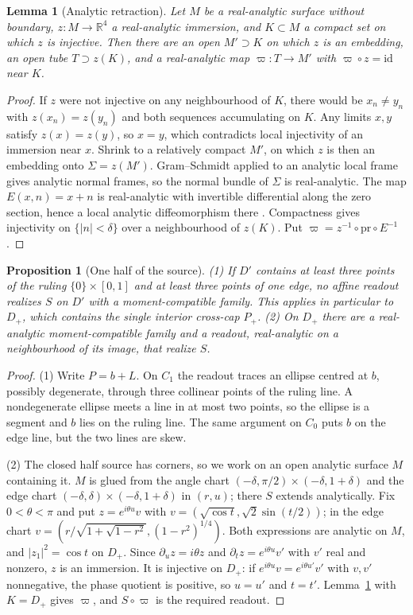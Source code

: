 \documentclass[11pt]{article}
\newtheorem{proposition}[theorem]{Proposition}
\newtheorem{lemma}[theorem]{Lemma}
\theoremstyle{definition}\newtheorem{definition}[theorem]{Definition}
\theoremstyle{remark}\newtheorem{remark}[theorem]{Remark}
\newcommand{\R}{\mathbb R}\newcommand{\C}{\mathbb C}\newcommand{\Z}{\mathbb Z}
\begin{document}
\begin{lemma}[Analytic retraction]\label{lem:retraction}
Let $M$ be a real-analytic surface without boundary, $z:M\to\R^4$ a
real-analytic immersion, and $K\subset M$ a compact set on which $z$ is
injective. Then there are an open $M'\supset K$ on which $z$ is an embedding,
an open tube $T\supset z(K)$, and a real-analytic map $\varpi:T\to M'$ with
$\varpi\circ z=\mathrm{id}$ near $K$.
\end{lemma}
\begin{proof}
If $z$ were not injective on any neighbourhood of $K$, there would be
$x_n\neq y_n$ with $z(x_n)=z(y_n)$ and both sequences accumulating on $K$. Any
limits $x,y$ satisfy $z(x)=z(y)$, so $x=y$, which contradicts local injectivity
of an immersion near $x$. Shrink to a relatively compact $M'$, on which $z$ is
then an embedding onto $\Sigma=z(M')$. Gram--Schmidt applied to an analytic
local frame gives analytic normal frames, so the normal bundle of $\Sigma$ is
real-analytic. The map $E(x,n)=x+n$ is real-analytic with invertible
differential along the zero section, hence a local analytic diffeomorphism
there \cite{krantzparks}. Compactness gives injectivity on
$\{|n|<\delta\}$ over a neighbourhood of $z(K)$. Put
$\varpi=z^{-1}\circ\mathrm{pr}\circ E^{-1}$.
\end{proof}

\begin{proposition}[One half of the source]\label{prop:half}
(1) If $D'$ contains at least three points of the ruling $\{0\}\times[0,1]$
and at least three points of one edge, no affine readout realizes $S$ on $D'$
with a moment-compatible family. This applies in particular to $D_+$, which
contains the single interior cross-cap $P_+$.
(2) On $D_+$ there are a real-analytic moment-compatible family and a readout,
real-analytic on a neighbourhood of its image, that realize $S$.
\end{proposition}
\begin{proof}
(1) Write $P=b+L$. On $C_1$ the readout traces an ellipse centred at $b$,
possibly degenerate, through three collinear points of the ruling line. A
nondegenerate ellipse meets a line in at most two points, so the ellipse is a
segment and $b$ lies on the ruling line. The same argument on $C_0$ puts $b$
on the edge line, but the two lines are skew.

(2) The closed half source has corners, so we work on an open analytic
surface $M$ containing it. $M$ is glued from the angle chart
$(-\delta,\pi/2)\times(-\delta,1+\delta)$ and the edge chart
$(-\delta,\delta)\times(-\delta,1+\delta)$ in $(r,u)$; there $S$ extends
analytically. Fix $0<\theta<\pi$ and put $z=e^{i\theta u}v$ with
$v=(\sqrt{\cos t},\sqrt2\sin(t/2))$; in the edge chart
$v=(r/\sqrt{1+\sqrt{1-r^2}},(1-r^2)^{1/4})$. Both expressions are analytic on
$M$, and $|z_1|^2=\cos t$ on $D_+$. Since $\partial_uz=i\theta z$ and
$\partial_tz=e^{i\theta u}v'$ with $v'$ real and nonzero, $z$ is an immersion.
It is injective on $D_+$: if $e^{i\theta u}v=e^{i\theta u'}v'$ with $v,v'$
nonnegative, the phase quotient is positive, so $u=u'$ and $t=t'$.
Lemma~\ref{lem:retraction} with $K=D_+$ gives $\varpi$, and $S\circ\varpi$ is
the required readout.
\end{proof}
\end{document}
